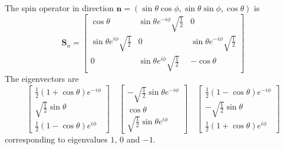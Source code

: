 The spin operator in direction $\bm{n} = (\sin\theta\cos\phi,\sin\theta\sin\phi,\cos\theta)$ is
\[\bm{S}_{n} =  \left[ \begin{matrix} \cos\theta& \sin\theta e^{-i\phi} \sqrt{\frac{1}{2}}& 0\\ \sin\theta e^{i\phi}\sqrt{\frac{1}{2}}& 0& \sin\theta e^{-i\phi} \sqrt{\frac{1}{2}}\\ 0& \sin\theta e^{i\phi} \sqrt{\frac{1}{2}}& -\cos\theta\end{matrix} \right]\]
The eigenvectors are
\[\left[ \begin{matrix} \frac{1}{2}(1+\cos\theta)e^{-i\phi}\\ \sqrt{\frac{1}{2}}\sin\theta \\ \frac{1}{2}(1-\cos\theta)e^{i\phi} \end{matrix} \right] \quad \left[ \begin{matrix} -\sqrt{\frac{1}{2}}\sin\theta e^{-i\phi}\\ \cos\theta \\ \sqrt{\frac{1}{2}}\sin\theta e^{i\phi} \end{matrix} \right] \quad \left[ \begin{matrix} \frac{1}{2}(1-\cos\theta)e^{-i\phi}\\ -\sqrt{\frac{1}{2}}\sin\theta \\ \frac{1}{2}(1+\cos\theta)e^{i\phi} \end{matrix} \right]\]
corresponding to eigenvalues $1$, $0$ and $-1$.

